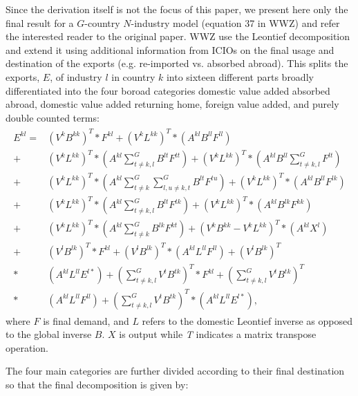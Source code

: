 \documentclass[11pt,a4paper]{article}
\begin{document}
Since the derivation itself is not the focus of this paper, we present here only the final result for a $G$-country $N$-industry model (equation 37 in WWZ) and refer the interested reader to the original paper. WWZ use the Leontief decomposition and extend it using additional information from ICIOs on the final usage and destination of the exports (e.g. re-imported vs. absorbed abroad). This splits the exports, $E$, of industry $l$ in country $k$ into sixteen different parts broadly differentiated into the four boroad categories domestic value added absorbed abroad, domestic value added returning home, foreign value added, and purely double counted terms:
\begin{align}\label{eq:wwz}
\begin{split}
E^{kl}
= &\left(V^k B^{kk} \right)^T * F^{kl} 
+ \left(V^k L^{kk} \right)^T * \left(A^{kl} B^{ll} F^{ll} \right)\\
+& \left(V^k L^{kk} \right)^T * (A^{kl} \sum_{t \neq k,l}^G  B^{lt} F^{tt} )
+ \left(V^k L^{kk} \right)^T *  (A^{kl} B^{ll} \sum_{t \neq k,l}^G  F^{lt} )\\ 
+&  \left(V^k L^{kk} \right)^T * (A^{kl} \sum_{t \neq k}^G \sum_{l,u \neq k,t}^G B^{lt} F^{tu} )
+ \left(V^k L^{kk} \right)^T * \left(A^{kl} B^{ll} F^{lk} \right)\\
+& \left(V^k L^{kk} \right)^T * (A^{kl} \sum_{t \neq k,l}^G  B^{lt} F^{tk} )
+ \left(V^k L^{kk} \right)^T * \left(A^{kl} B^{lk} F^{kk} \right) \\
+& \left(V^k L^{kk} \right)^T * (A^{kl} \sum_{t \neq k}^G  B^{lk} F^{kt} )
+ \left(V^k B^{kk} -  V^k L^{kk} \right)^T * \left(A^{kl} X^{l}  \right)\\
+& \left(V^l B^{lk} \right)^T * F^{kl}
+ \left(V^l B^{lk} \right)^T *  \left(A^{kl} L^{ll} F^{ll} \right)
+ \left(V^l B^{lk} \right)^T \\
*&  \left(A^{kl} L^{ll} E^{l*} \right) + (\sum_{t \neq k,l}^G  V^{t} B^{tk} )^{T} * F^{kl}
+ (\sum_{t \neq k,l}^G  V^{t} B^{tk} )^{T}\\
*&   \left(A^{kl} L^{ll} F^{ll} \right) + (\sum_{t \neq k,l}^G  V^{t} B^{tk} )^{T} *  \left(A^{kl} L^{ll} E^{l*} \right) ,
\end{split}
\end{align}
where $F$ is final demand, and $L$ refers to the domestic Leontief inverse as opposed to the global inverse $B$. $X$ is output while \textit{T} indicates a matrix transpose operation. 

The four main categories are further divided according to their final destination so that the final decomposition is given by:
\end{document}

